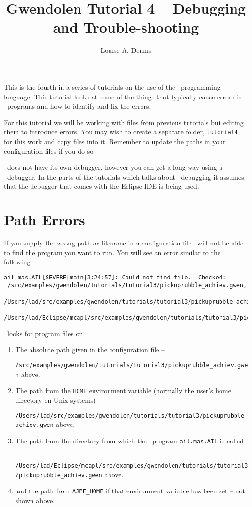 \documentclass[a4]{article}
\author{Louise A. Dennis}
\title{Gwendolen Tutorial 4 -- Debugging and Trouble-shooting}
\begin{document}
\maketitle
This is the fourth in a series of tutorials on the use of the \gwendolen\ programming language.  This tutorial looks at some of the things that typically cause errors in \gwendolen\ programs and how to identify and fix the errors.

For this tutorial we will be working with files from previous tutorials but editing them to introduce errors.  You may wish to create a separate folder, \texttt{tutorial4} for this work and copy files into it.  Remember to update the paths in your configuration files if you do so.

\gwendolen\ does not have its own debugger, however you can get a long way using a \java\ debugger.  In the parts of the tutorials which talks about \java\ debugging it assumes that the debugger that comes with the Eclipse IDE is being used.

\section{Path Errors}
If you supply the wrong path or filename in a configuration file \gwendolen\ will not be able to find the program you want to run.  You will see an error similar to the following: 
\begin{verbatim}
ail.mas.AIL[SEVERE|main|3:24:57]: Could not find file.  Checked: 
 /src/examples/gwendolen/tutorials/tutorial3/pickuprubble_achiev.gwen,
 /Users/lad/src/examples/gwendolen/tutorials/tutorial3/pickuprubble_achiev.gwen,
 /Users/lad/Eclipse/mcapl/src/examples/gwendolen/tutorials/tutorial3/pickuprubble_achiev.gwen 
\end{verbatim}

\gwendolen\ looks for program files on
\begin{enumerate}
\item The absolute path given in the configuration file -- 

\texttt{/src/examples/gwendolen/tutorials/tutorial3/pickuprubble\_achiev.gwen} above.
\item The path from the \texttt{HOME} environment variable (normally the user's home directory on Unix systems) -- 

\texttt{/Users/lad/src/examples/gwendolen/tutorials/tutorial3/pickuprubble\_achiev.gwen} above.
\item The path from the directory from which the \java\ program \texttt{ail.mas.AIL} is called  -- 

\texttt{/Users/lad/Eclipse/mcapl/src/examples/gwendolen/tutorials/tutorial3/pickuprubble\_achiev.gwen} above.
\item and the path from \texttt{AJPF\_HOME} if that environment variable has been set -- not shown above.
\end{enumerate}
\end{document}
